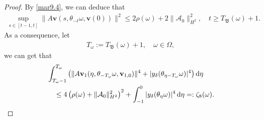 \documentclass{elsarticle}
\theoremstyle{definition}
\numberwithin{equation}{section}
\renewcommand{\d}{{\rm{d}}}
\begin{document}
\begin{proof}
By \eqref{mar9.4}, we can deduce that
\begin{align*}
\sup_{s\in [t-1,t]}
 \|A\textbf{v}(s,\theta_{-t}\omega,  \textbf{v}(0)) \|^2
  \leq     2\rho(\omega) +2\|\mathcal A_0\|_{H^2}^2,
 \quad  t\geq T_{\mathfrak B} (\omega)+1.
\end{align*}
As a consequence,  let
\begin{align*}
T_\omega :=T_{\mathfrak B} (\omega)+1, \quad \omega\in \Omega,
\end{align*}
we can get that
\begin{align}
 & \int_{T_\omega -1}^{T_\omega }  \left ( \|A\textbf{v}_1(\eta,\theta_{-T_\omega }\omega,\textbf{v}_{1,0})\|^4+|y_\delta(\theta_{\eta-T_\omega }\omega)|^4\right)  \d \eta  \nonumber\\
 &\quad
 \leq 4 \left( \rho(\omega) +\|\mathcal A_0\|_{H^2}^2 \right)^2 + \int_{-1}^0 |y_\delta(\theta_{\eta}\omega)|^4 \, \d \eta =: \zeta_8(\omega) . \label{mar11.2}
 \end{align}


\end{proof}
\end{document}
